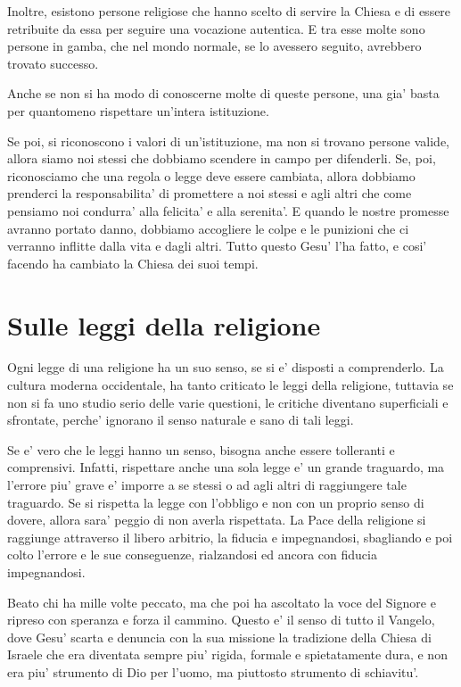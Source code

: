 Inoltre, esistono persone religiose che hanno scelto di servire la Chiesa e di essere retribuite da essa per seguire una vocazione autentica. E tra esse molte sono persone in gamba, che nel mondo normale, se lo avessero seguito, avrebbero trovato successo.

Anche se non si ha modo di conoscerne molte di queste persone, una gia' basta per quantomeno rispettare un'intera istituzione.

Se poi, si riconoscono i valori di un'istituzione, ma non si trovano persone valide, allora siamo noi stessi che dobbiamo scendere in campo per difenderli. Se, poi, riconosciamo che una regola o legge deve essere cambiata, allora dobbiamo prenderci la responsabilita' di promettere a noi stessi e agli altri che come pensiamo noi condurra' alla felicita' e alla serenita'. E quando le nostre promesse avranno portato danno, dobbiamo accogliere le colpe e le punizioni che ci verranno inflitte dalla vita e dagli altri. Tutto questo Gesu' l'ha fatto, e cosi' facendo ha cambiato la Chiesa dei suoi tempi. 

\section{Sulle leggi della religione}

Ogni legge di una religione ha un suo senso, se si e' disposti a comprenderlo. La cultura moderna occidentale, ha tanto criticato le leggi della religione, tuttavia se non si fa uno studio serio delle varie questioni, le critiche diventano superficiali e sfrontate, perche' ignorano il senso naturale e sano di tali leggi.

Se e' vero che le leggi hanno un senso, bisogna anche essere tolleranti e comprensivi. Infatti, rispettare anche una sola legge e' un grande traguardo, ma l'errore piu' grave e' imporre a se stessi o ad agli altri di raggiungere tale traguardo. Se si rispetta la legge con l'obbligo e non con un proprio senso di dovere, allora sara' peggio di non averla rispettata. La Pace della religione si raggiunge attraverso il libero arbitrio, la fiducia e impegnandosi, sbagliando e poi colto l'errore e le sue conseguenze, rialzandosi ed ancora con fiducia impegnandosi.

Beato chi ha mille volte peccato, ma che poi ha ascoltato la voce del Signore e ripreso con speranza e forza il cammino. Questo e' il senso di tutto il Vangelo, dove Gesu' scarta e denuncia con la sua missione la tradizione della Chiesa di Israele che era diventata sempre piu' rigida, formale e spietatamente dura, e non era piu' strumento di Dio per l'uomo, ma piuttosto strumento di schiavitu'.

